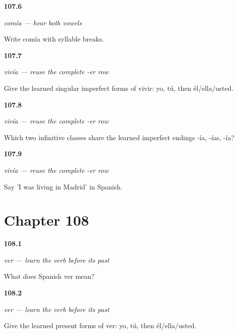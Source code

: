 \noindent\begin{minipage}[t]{\linewidth}
\raggedright
\hypertarget{review-ES-C16-comer-imperfecto-syllables}{\textbf{107.6}} \emph{comía — hear both vowels}\par
\small Write comía with syllable breaks.
\end{minipage}\par\medskip

\noindent\begin{minipage}[t]{\linewidth}
\raggedright
\hypertarget{review-ES-C16-vivir-imperfecto-singular-forms}{\textbf{107.7}} \emph{vivía — reuse the complete -er row}\par
\small Give the learned singular imperfect forms of vivir: yo, tú, then él/ella/usted.
\end{minipage}\par\medskip

\noindent\begin{minipage}[t]{\linewidth}
\raggedright
\hypertarget{review-ES-C16-vivir-imperfecto-shared-row}{\textbf{107.8}} \emph{vivía — reuse the complete -er row}\par
\small Which two infinitive classes share the learned imperfect endings -ía, -ías, -ía?
\end{minipage}\par\medskip

\noindent\begin{minipage}[t]{\linewidth}
\raggedright
\hypertarget{review-ES-C16-vivir-imperfecto-vivia-madrid}{\textbf{107.9}} \emph{vivía — reuse the complete -er row}\par
\small Say 'I was living in Madrid' in Spanish.
\end{minipage}\par\medskip

\section*{Chapter 108}

\noindent\begin{minipage}[t]{\linewidth}
\raggedright
\hypertarget{review-ES-C16-ver-meaning}{\textbf{108.1}} \emph{ver — learn the verb before its past}\par
\small What does Spanish ver mean?
\end{minipage}\par\medskip

\noindent\begin{minipage}[t]{\linewidth}
\raggedright
\hypertarget{review-ES-C16-ver-present-singular}{\textbf{108.2}} \emph{ver — learn the verb before its past}\par
\small Give the learned present forms of ver: yo, tú, then él/ella/usted.
\end{minipage}\par\medskip

